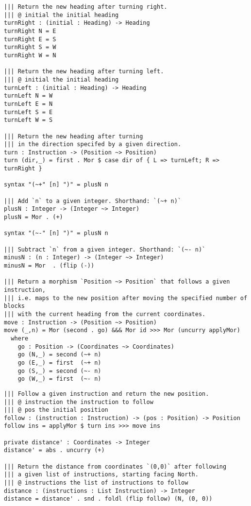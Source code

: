 \documentclass[b5paper,twoside]{amsbook}
\begin{document}
\begin{verbatim}
||| Return the new heading after turning right.
||| @ initial the initial heading
turnRight : (initial : Heading) -> Heading
turnRight N = E
turnRight E = S
turnRight S = W
turnRight W = N

||| Return the new heading after turning left.
||| @ initial the initial heading
turnLeft : (initial : Heading) -> Heading
turnLeft N = W
turnLeft E = N
turnLeft S = E
turnLeft W = S

||| Return the new heading after turning
||| in the direction specifed by a given direction.
turn : Instruction -> (Position ~> Position)
turn (dir,_) = first . Mor $ case dir of { L => turnLeft; R => turnRight }

syntax "(~+" [n] ")" = plusN n

||| Add `n` to a given integer. Shorthand: `(~+ n)`
plusN : Integer -> (Integer ~> Integer)
plusN = Mor . (+)

syntax "(~-" [n] ")" = plusN n

||| Subtract `n` from a given integer. Shorthand: `(~- n)`
minusN : (n : Integer) -> (Integer ~> Integer)
minusN = Mor  . (flip (-))

||| Return a morphism `Position ~> Position` that follows a given instruction,
||| i.e. maps to the new position after moving the specified number of blocks
||| with the current heading from the current coordinates.
move : Instruction -> (Position ~> Position)
move (_,n) = Mor (second . go) &&& Mor id >>> Mor (uncurry applyMor)
  where
    go : Position -> (Coordinates ~> Coordinates)
    go (N,_) = second (~+ n)
    go (E,_) = first  (~+ n)
    go (S,_) = second (~- n)
    go (W,_) = first  (~- n)
\end{verbatim}

\newpage

\begin{verbatim}
||| Follow a given instruction and return the new position.
||| @ instruction the instruction to follow
||| @ pos the initial position
follow : (instruction : Instruction) -> (pos : Position) -> Position
follow ins = applyMor $ turn ins >>> move ins

private distance' : Coordinates -> Integer
distance' = abs . uncurry (+)

||| Return the distance from coordinates `(0,0)` after following
||| a given list of instructions, starting facing North.
||| @ instructions the list of instructions to follow
distance : (instructions : List Instruction) -> Integer
distance = distance' . snd . foldl (flip follow) (N, (0, 0))
\end{verbatim}
\end{document}
